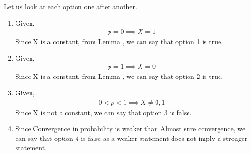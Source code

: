 \documentclass[journal,12pt,twocolumn]{IEEEtran}
\begin{document}
Let us look at each option one after another.
\begin{enumerate}
    \item Given,
    \begin{align}\nonumber
        p = 0 \implies X = 1
    \end{align}
    Since X is a constant, from Lemma , we can say that option 1 is true.
    \item Given,
      \begin{align}\nonumber
        p = 1 \implies X = 0
    \end{align}
    Since X is a constant, from Lemma , we can say that option 2 is true.
    \item Given,
      \begin{align}\nonumber
        0 < p < 1 \implies X \neq 0,1
    \end{align}
    Since X is not a constant, we can say that option 3 is false.
    \item Since Convergence in probability is weaker than Almost sure convergence, we can say that option 4 is false as a weaker statement does not imply a stronger statement.
\end{enumerate}
\end{document}
